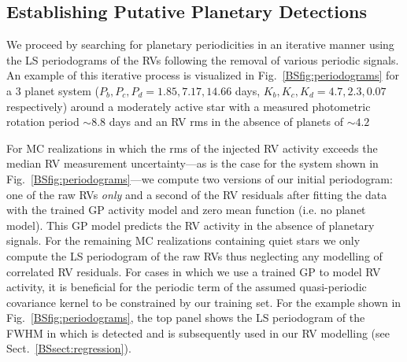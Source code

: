 \subsection{Establishing Putative Planetary Detections} \label{BSsect:det}
We proceed by searching for planetary periodicities in an iterative manner using the LS periodograms
of the RVs following the removal of various periodic signals.
An example of this iterative process is visualized in Fig.~\ref{BSfig:periodograms} for a 3 planet system
($P_b,P_c,P_d=1.85,7.17,14.66$ days, $K_b,K_c,K_d=4.7,2.3,0.07$ \mps{} respectively)
around a moderately active star with a measured photometric rotation period \prot{} $\sim 8.8$ days and
an RV rms in the absence of planets of $\sim 4.2$ 

For MC realizations in which the rms of the injected RV activity exceeds the median RV measurement
uncertainty---as is the case for the system shown in Fig.~\ref{BSfig:periodograms}---we compute two
versions of our initial periodogram: one of the raw RVs \emph{only} and a second
of the RV residuals after fitting the data with the trained GP activity model and zero mean function
(i.e. no planet model). This GP model predicts the RV activity in the absence of planetary signals.
For the remaining MC realizations containing quiet stars
we only compute the LS periodogram of the raw RVs thus neglecting any
modelling of correlated RV residuals. For cases in which we use a trained GP to model RV activity,
it is beneficial for
the periodic term of the assumed quasi-periodic covariance kernel to be constrained by our training set.
For the example shown in Fig.~\ref{BSfig:periodograms}, the top panel shows the LS periodogram of the FWHM
in which \prot{} is detected and is subsequently used in our RV modelling (see Sect.~\ref{BSsect:regression}).

